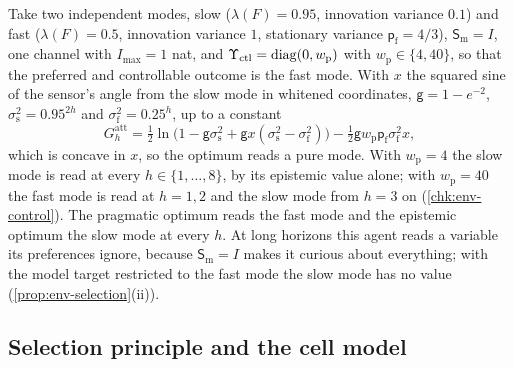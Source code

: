 \begin{example}\label{ex:env-fast-preference}
Take two independent modes, slow ($\lambda(F)=0.95$, innovation variance $0.1$) and fast ($\lambda(F)=0.5$, innovation variance $1$, stationary variance $\mathsf p_{\mathrm f}=4/3$), $\mathsf S_{\mathrm m}=I$, one channel with $I_{\max}=1$ nat, and $\Upsilon_{\mathrm{ctl}}=\operatorname{diag}(0,w_{\mathrm p})$ with $w_{\mathrm p}\in\{4,40\}$, so that the preferred and controllable outcome is the fast mode. With $x$ the squared sine of the sensor's angle from the slow mode in whitened coordinates, $\mathsf g=1-e^{-2}$, $\sigma_{\mathrm s}^2=0.95^{2h}$ and $\sigma_{\mathrm f}^2=0.25^h$, up to a constant
\[
G^{\mathrm{att}}_h=\tfrac12\ln\bigl(1-\mathsf g\sigma_{\mathrm s}^2+\mathsf gx(\sigma_{\mathrm s}^2-\sigma_{\mathrm f}^2)\bigr)-\tfrac12\mathsf gw_{\mathrm p}\mathsf p_{\mathrm f}\sigma_{\mathrm f}^2x,
\]
which is concave in $x$, so the optimum reads a pure mode. With $w_{\mathrm p}=4$ the slow mode is read at every $h\in\{1,\dots,8\}$, by its epistemic value alone; with $w_{\mathrm p}=40$ the fast mode is read at $h=1,2$ and the slow mode from $h=3$ on (\cref{chk:env-control}). The pragmatic optimum reads the fast mode and the epistemic optimum the slow mode at every $h$. At long horizons this agent reads a variable its preferences ignore, because $\mathsf S_{\mathrm m}=I$ makes it curious about everything; with the model target restricted to the fast mode the slow mode has no value (\cref{prop:env-selection}(ii)).
\end{example}

\subsection{Selection principle and the cell model}\label{sup:env-selection-principle-and-the-cell-model}

